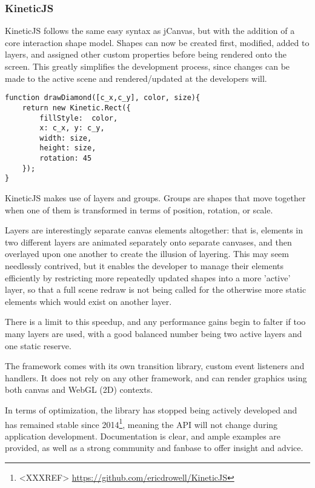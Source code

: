 \subsubsection{KineticJS}

KineticJS follows the same easy syntax as jCanvas, but with the addition of a core interaction shape model. Shapes can now be created first, modified, added to layers, and assigned other custom properties before being rendered onto the screen. This greatly simplifies the development process, since changes can be made to  the active scene and rendered/updated at the developers will. 

\begingroup
\begin{spacing}{1}
\begin{lstlisting}[label=code:kineticjs]
function drawDiamond([c_x,c_y], color, size){
	return new Kinetic.Rect({
		fillStyle:  color,
		x: c_x,	y: c_y,
		width: size,
		height: size,
		rotation: 45
	});
}
\end{lstlisting}
\vspace{-10pt}
\end{spacing}
\endgroup

KineticJS makes use of layers and groups. Groups are shapes that move together when one of them is transformed in terms of position, rotation, or scale\citep{kineticjs}. 

Layers are interestingly separate canvas elements altogether: that is, elements in two different layers are animated separately onto separate canvases, and then overlayed upon one another to create the illusion of layering.
This may seem needlessly contrived, but it enables the developer to manage their elements efficiently by restricting more repeatedly updated shapes into a more 'active' layer, so that a full scene redraw is not being called for the otherwise more static elements which would exist on another layer.

There is a limit to this speedup, and any performance gains begin to falter if too many layers are used, with a good balanced number being two active layers and one static reserve.

The framework comes with its own transition library, custom event listeners and handlers. It does not rely on any other framework, and can render graphics using both canvas and WebGL (2D) contexts.

In terms of optimization, the library has stopped being actively developed and has remained stable since 2014\footnote{<XXXREF> \url{https://github.com/ericdrowell/KineticJS}}, meaning the API will not change during application development. Documentation is clear, and ample examples are provided, as well as a strong community and fanbase to offer insight and advice.

